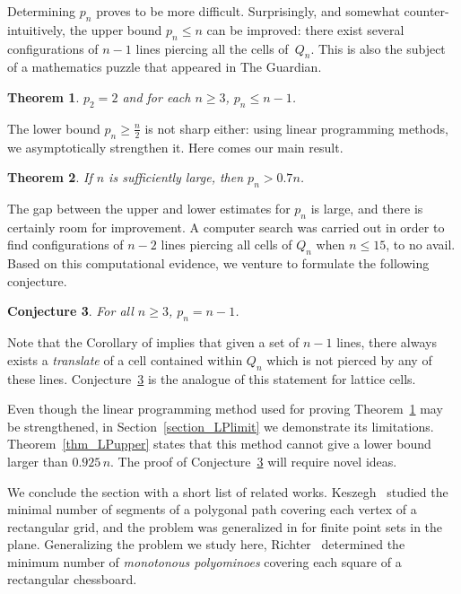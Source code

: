 \documentclass[11pt,a4paper]{amsart}
\newtheorem{theorem}{Theorem}
\newtheorem{conjecture}[theorem]{Conjecture}
\begin{document}
Determining  $p_n$ proves to be more difficult. Surprisingly, and somewhat counter-intuitively, the upper bound $p_n \leq n$ can be improved: there exist several configurations of $n-1$ lines piercing all the cells of~$Q_n$. This is also the subject of a mathematics puzzle \cite{BS19} that appeared in The Guardian.
\begin{theorem}\label{thm_piercing_upper}
$p_2=2$ and for each $n \geq 3$, $p_n \leq n-1$.
\end{theorem}
The lower bound $p_n \geq \frac n 2$ is not sharp either: using linear programming methods, we asymptotically strengthen it. Here comes our main result.
\begin{theorem}\label{thm_piercing_lower}
If $n$ is sufficiently large, then $p_n > 0.7 n $.
\end{theorem}

The gap between the upper and lower estimates for $p_n$ is large, and there is certainly room for improvement. A computer search was carried out in order to find configurations of $n-2$ lines piercing all cells of $Q_n$ when $n \leq 15$, to no avail. Based on this computational evidence, we venture to formulate the following conjecture.

\begin{conjecture}\label{conj_piercing}
  For all $n \geq 3$, $p_n = n-1$.
\end{conjecture}

Note that the Corollary of \cite{B91} implies that given a set of $n-1$ lines, there always exists a {\em translate} of a cell contained within $Q_n$ which is not pierced by any of these lines. Conjecture~\ref{conj_piercing} is the analogue of this statement for lattice cells.

Even though the linear programming method used for proving Theorem~\ref{thm_piercing_upper} may be strengthened, in Section~\ref{section_LPlimit} we demonstrate its limitations. Theorem~\ref{thm_LPupper} states that  this method cannot give a lower bound larger than $0.925 \, n$. The proof of Conjecture~\ref{conj_piercing} will require novel ideas.

We conclude the section with a short list of related works. Keszegh~\cite{K12} studied the  minimal number of segments of a polygonal path covering each vertex of a rectangular grid, and the problem was generalized in \cite{DGKT14} for finite point sets in the plane. Generalizing the problem we study here, Richter~\cite{R22} determined the minimum number of {\em monotonous polyominoes} covering each square of a rectangular chessboard. 
\end{document}
